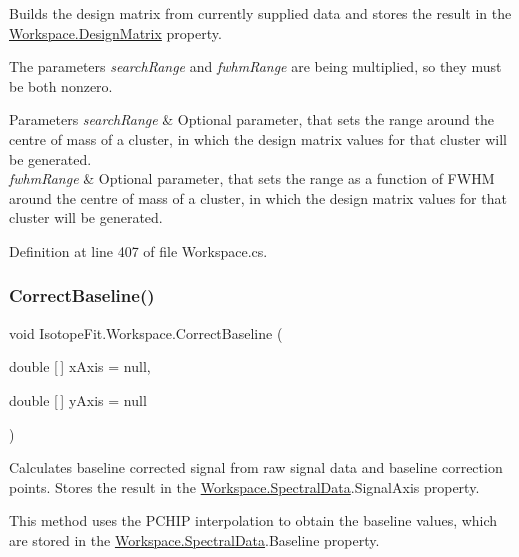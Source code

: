 Builds the design matrix from currently supplied data and stores the result in the \hyperlink{class_isotope_fit_1_1_workspace_ae24a2ee8f965fb2ed7ad3a592163271d}{Workspace.\+Design\+Matrix} property. 

The parameters {\itshape search\+Range}  and {\itshape fwhm\+Range}  are being multiplied, so they must be both nonzero.


\begin{DoxyParams}{Parameters}
{\em search\+Range} & Optional parameter, that sets the range around the centre of mass of a cluster, in which the design matrix values for that cluster will be generated.\\
\hline
{\em fwhm\+Range} & Optional parameter, that sets the range as a function of F\+W\+HM around the centre of mass of a cluster, in which the design matrix values for that cluster will be generated.\\
\hline
\end{DoxyParams}


Definition at line 407 of file Workspace.\+cs.

\mbox{\label{class_isotope_fit_1_1_workspace_aa0b81213937d49ae3a6183563cfe0f60}} 
\subsubsection{\texorpdfstring{Correct\+Baseline()}{CorrectBaseline()}}
{\footnotesize\ttfamily void Isotope\+Fit.\+Workspace.\+Correct\+Baseline (\begin{DoxyParamCaption}\item[{double \mbox{[}$\,$\mbox{]}}]{x\+Axis = {\ttfamily null},  }\item[{double \mbox{[}$\,$\mbox{]}}]{y\+Axis = {\ttfamily null} }\end{DoxyParamCaption})}



Calculates baseline corrected signal from raw signal data and baseline correction points. Stores the result in the \hyperlink{class_isotope_fit_1_1_workspace_a1d6cc2dd07cbfe920da9f1bffc9b32c2}{Workspace.\+Spectral\+Data}.Signal\+Axis property. 

This method uses the P\+C\+H\+IP interpolation to obtain the baseline values, which are stored in the \hyperlink{class_isotope_fit_1_1_workspace_a1d6cc2dd07cbfe920da9f1bffc9b32c2}{Workspace.\+Spectral\+Data}.Baseline property.

